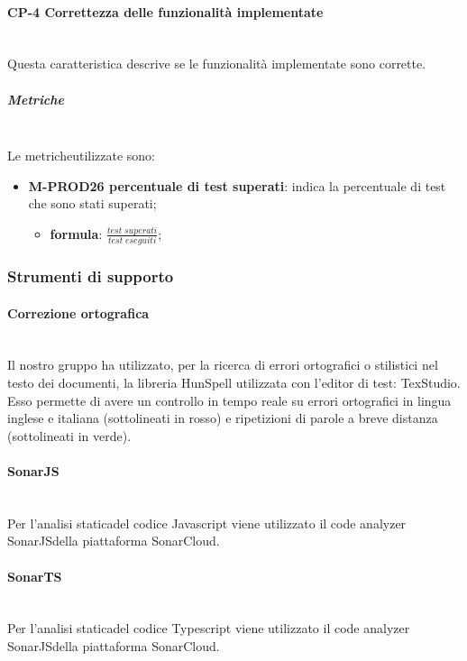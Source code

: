 	\paragraph{CP-4 Correttezza delle funzionalità implementate} \mbox{}\\ [1mm]
	Questa caratteristica descrive se le funzionalità implementate sono corrette.
	\subparagraph{Metriche}\mbox{}\\ [1mm]
	Le metriche\glosp utilizzate sono:
	\begin{itemize}
		\item \textbf{M-PROD26 percentuale di test superati}: indica la percentuale di test che sono stati superati;
		\begin{itemize}
			\item[] \textbf{formula}: $\frac{test \; superati}{test \; eseguiti}$;
		\end{itemize}
	\end{itemize}

\subsubsection{Strumenti di supporto}
	\paragraph{Correzione ortografica}\mbox{}\\ [1mm]
	Il nostro gruppo ha utilizzato, per la ricerca di errori ortografici o stilistici nel testo dei documenti, la libreria HunSpell utilizzata con l'editor di test: TexStudio. Esso permette di avere un controllo in tempo reale su errori ortografici in lingua inglese e italiana (sottolineati in rosso) e ripetizioni di parole a breve distanza (sottolineati in verde).
	\paragraph{SonarJS}\mbox{}\\ [1mm]
	Per l'analisi statica\glosp del codice Javascript viene utilizzato il code analyzer SonarJS\glosp della piattaforma SonarCloud.
	\paragraph{SonarTS}\mbox{}\\ [1mm]
	Per l'analisi statica\glosp del codice Typescript viene utilizzato il code analyzer SonarJS\glosp della piattaforma SonarCloud.
